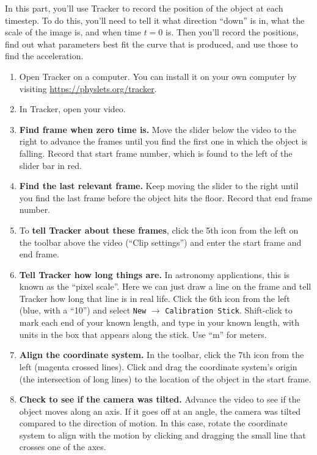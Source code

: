 In this part, you'll use Tracker to record the position of the object at each timestep. To do this, you'll need to tell it what direction ``down'' is in, what the scale of the image is, and when time $t=0$ is. Then you'll record the positions, find out what parameters best fit the curve that is produced, and use those to find the acceleration.

\begin{enumerate}
	\item Open Tracker on a computer. You can install it on your own computer by visiting \url{https://physlets.org/tracker}.
	
	\item In Tracker, open your video.
	
	\item \textbf{Find frame when zero time is.} Move the slider below the video to the right to advance the frames until you find the first one in which the object is falling. Record that start frame number, which is found to the left of the slider bar in red.
	
	\item \textbf{Find the last relevant frame.} Keep moving the slider to the right until you find the last frame before the object hits the floor. Record that end frame number.
	
	\item To \textbf{tell Tracker about these frames}, click the 5th icon from the left on the toolbar above the video (``Clip settings'') and enter the start frame and end frame.
	
	\item \textbf{Tell Tracker how long things are.} In astronomy applications, this is known as the ``pixel scale''. Here we can just draw a line on the frame and tell Tracker how long that line is in real life. Click the 6th icon from the left (blue, with a ``10'') and select \texttt{New} $\rightarrow$ \texttt{Calibration Stick}. Shift-click to mark each end of your known length, and type in your known length, with units in the box that appears along the stick. Use ``m'' for meters.
	
	\item \textbf{Align the coordinate system.} In the toolbar, click the 7th icon from the left (magenta crossed lines). Click and drag the coordinate system's origin (the intersection of long lines) to the location of the object in the start frame.
	
	\item \textbf{Check to see if the camera was tilted.} Advance the video to see if the object moves along an axis. If it goes off at an angle, the camera was tilted compared to the direction of motion. In this case, rotate the coordinate system to align with the motion by clicking and dragging the small line that crosses one of the axes.
	

\end{enumerate}
